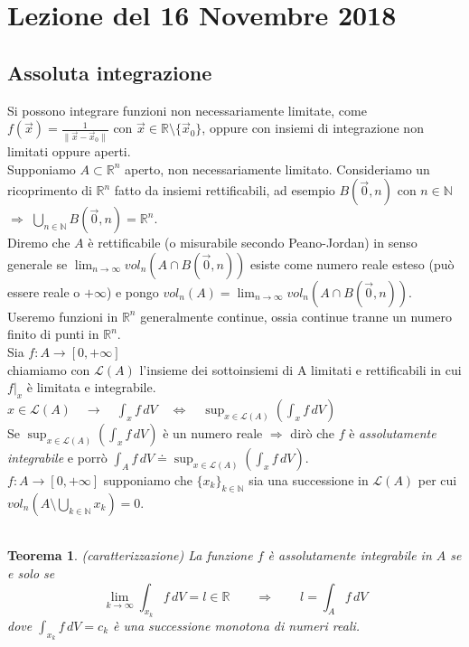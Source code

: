 \documentclass[10pt]{article}
\theoremstyle{plain}
\newtheorem{thm}{Teorema}[section]
\theoremstyle{definition}
\begin{document}
\section{Lezione del 16 Novembre 2018}
\subsection{Assoluta integrazione}
Si possono integrare funzioni non necessariamente limitate, come $f(\vec{x})=\frac{1}{\| \vec{x} - \vec{x}_0 \|}$ con $\vec{x} \in \mathbb{R} \setminus \{ \vec{x}_0 \}$, oppure con insiemi di integrazione non limitati oppure aperti.\\
Supponiamo $A \subset \mathbb{R}^n$ aperto, non necessariamente limitato. Consideriamo un ricoprimento di $\mathbb{R}^n$ fatto da insiemi rettificabili, ad esempio $B(\vec{0},n)$ con $n \in \mathbb{N}$ $\Rightarrow$ $\bigcup_{n \in \mathbb{N}} B(\vec{0},n) = \mathbb{R}^n$.\\
Diremo che $A$ è rettificabile (o misurabile secondo Peano-Jordan) in senso generale se $\lim_{n \to \infty} vol_n (A \cap B(\vec{0},n))$ esiste come numero reale esteso (può essere reale o $+\infty$) e pongo $vol_n(A) = \lim_{n \to \infty} vol_n (A \cap B(\vec{0},n))$.\\
Useremo funzioni in $\mathbb{R}^n$ generalmente continue, ossia continue tranne un numero finito di punti in $\mathbb{R}^n$.\\
Sia $f:A \to [0,+\infty]$\\
chiamiamo con $\mathcal{L}(A)$ l'insieme dei sottoinsiemi di A limitati e rettificabili in cui $f|_x$ è limitata e integrabile.\\
$x \in \mathcal{L}(A) \quad \to \quad \int_x f\,dV \quad \Leftrightarrow \quad \sup_{x \in \mathcal{L}(A)} \left( \int_x f \,dV \right)$\\
Se $\sup_{x \in \mathcal{L}(A)} \left( \int_x f \,dV \right)$ è un numero reale $\Rightarrow$ dirò che $f$ è \textit{assolutamente integrabile} e porrò $\int_A f\,dV \doteq \sup_{x \in \mathcal{L}(A)} \left( \int_x f \,dV \right)$.\\
$f:A \to [0,+\infty]$ supponiamo che $\{ x_k \}_{k \in \mathbb{N}}$ sia una successione in $\mathcal{L}(A)$ per cui $vol_n(A \setminus \bigcup_{k \in \mathbb{N}}x_k)=0$.\\
\\
\begin{thm} (caratterizzazione)
La funzione $f$ è assolutamente integrabile in $A$ se e solo se 
$$\lim_{k \to \infty} \int_{x_k} f\,dV = l \in \mathbb{R} \qquad \Rightarrow \qquad l = \int_A f\,dV$$
dove $\int_{x_k} f\,dV = c_k$ è una successione monotona di numeri reali. \\
\end{thm}
\end{document}
